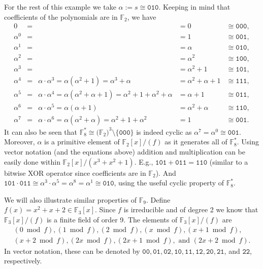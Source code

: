 \documentclass[openany, a4paper, 10pt]{book}
\theoremstyle{plain}
\theoremstyle{plain}
\theoremstyle{plain}
\theoremstyle{definition}
\theoremstyle{plain}
\theoremstyle{definition}
\theoremstyle{remark}
\begin{document}
\begin{examplebox}
    For the rest of this example we take $\alpha := s \cong \texttt{010}$.
    Keeping in mind that coefficients of the polynomials are in $\mathbb F_2$, we have
    {\allowdisplaybreaks\begin{align*}
        0       &=&&=0&\cong\texttt{000},\\
        \alpha^0&=&&=1&\cong\texttt{001},\\
        \alpha^1&=&&=\alpha&\cong\texttt{010},\\
        \alpha^2&=&&=\alpha^2&\cong\texttt{100},\\
        \alpha^3&=&&=\alpha^2+1&\cong\texttt{101},\\
        \alpha^4&=&\alpha\cdot\alpha^3=\alpha(\alpha^2+1)=\alpha^3+\alpha&=\alpha^2+\alpha+1&\cong\texttt{111},\\
        \alpha^5&=&\alpha\cdot\alpha^4=\alpha(\alpha^2+\alpha+1)=\alpha^2+1+\alpha^2+\alpha&=\alpha + 1&\cong\texttt{011},\\
        \alpha^6&=&\alpha\cdot\alpha^5=\alpha(\alpha+1)&=\alpha^2+\alpha&\cong\texttt{110},\\
        \alpha^7&=&\alpha\cdot\alpha^6=\alpha(\alpha^2+\alpha)=\alpha^2+1+\alpha^2&=1&\cong\texttt{001}.
    \end{align*}
    }It can also be seen that $\mathbb F_8^* \cong \mathbb (\mathbb F_2)^3 \setminus \{ \texttt{000} \}$ is indeed cyclic as $\alpha^7=\alpha^0\cong\texttt{001}$.
    Moreover, $\alpha$ is a primitive element of $\mathbb F_2[x]/(f)$ as it generates all of $\mathbb F_8^*$.
    Using vector notation (and the equations above) addition and multiplication can be easily done within $\mathbb F_2[x]/(x^3+x^2+1)$.
    E.g., $\texttt{101} + \texttt{011} = \texttt{110}$ (similar to a bitwise XOR operator since coefficients are in $\mathbb F_2$).
    And $\texttt{101} \cdot \texttt{011} \cong \alpha^3 \cdot \alpha^5 = \alpha^8 = \alpha^1 \cong \texttt{010}$, using the useful cyclic property of $\mathbb F_8^*$.

    \tcbline

    We will also illustrate similar properties of $\mathbb F_9$.
    Define $f(x) = x^2 + x + 2 \in \mathbb F_3[x]$.
    Since $f$ is irreducible and of degree 2 we know that $\mathbb F_3[x]/(f)$ is a finite field of order 9.
    The elements of $\mathbb F_3[x]/(f)$ are
    \begin{gather*}
        (0\bmod f), (1 \bmod f), (2\bmod f), (x\bmod f), (x+1\bmod f), \\
        (x+2\bmod f), (2x\bmod f), (2x+1\bmod f),\text{ and }(2x+2\bmod f).
    \end{gather*}
    In vector notation, these can be denoted by $\texttt{00}, \texttt{01}, \texttt{02}, \texttt{10}, \texttt{11}, \texttt{12}, \texttt{20}, \texttt{21}$, and $\texttt{22}$, respectively.


\end{examplebox}
\end{document}
